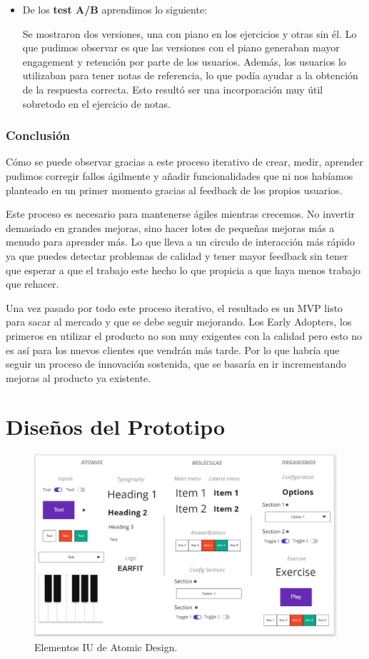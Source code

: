 \documentclass[12pt,twoside,titlepage]{report}
\begin{document}
{\begin{itemize}
    \item De los \textbf{test A/B} aprendimos lo siguiente:
    
    Se mostraron dos versiones, una con piano en los ejercicios y otras sin él. Lo que pudimos observar es que las versiones con el piano generaban mayor engagement y retención por parte de los usuarios. Además, los usuarios lo utilizaban para tener notas de referencia, lo que podía ayudar a la obtención de la respuesta correcta. Esto resultó ser una incorporación muy útil sobretodo en el ejercicio de notas.
\end{itemize}


\subsection{Conclusión}
Cómo se puede observar gracias a este proceso iterativo de crear, medir, aprender pudimos corregir fallos ágilmente y añadir funcionalidades que ni nos habíamos planteado en un primer momento gracias al feedback de los propios usuarios.

Este proceso es necesario para mantenerse ágiles mientras crecemos. No invertir demasiado en grandes mejoras, sino hacer lotes de pequeñas mejoras más a menudo para aprender más. Lo que lleva a un circulo de interacción más rápido ya que puedes detectar problemas de calidad y tener mayor feedback sin tener que esperar a que el trabajo este hecho lo que propicia a que haya menos trabajo que rehacer.

Una vez pasado por todo este proceso iterativo, el resultado es un MVP listo para sacar al mercado y que se debe seguir mejorando. 
Los Early Adopters, los primeros en utilizar el producto no son muy exigentes con la calidad pero esto no es así para los nuevos clientes que vendrán más tarde. 
Por lo que habría que seguir un proceso de innovación sostenida, que se basaría en ir incrementando mejoras al producto ya existente.

\chapter{Diseños del Prototipo}

\label{sec:Prototipos}
\begin{figure}[H]
    \centering
    \includegraphics[scale=0.5]{Design Thinking/Prototipo/AtomicDesign}
    \caption{Elementos IU de Atomic Design.}
    \label{fig:AtomicDesign}
\end{figure}

}
\end{document}
